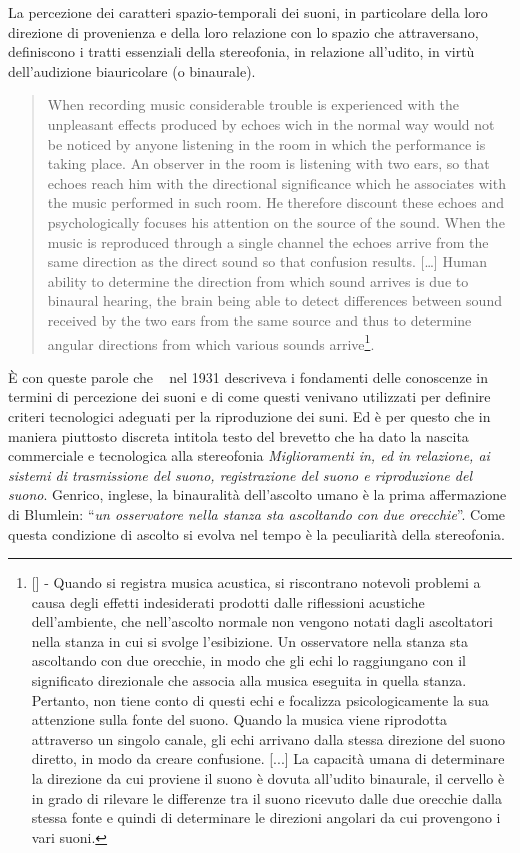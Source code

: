 La percezione dei caratteri spazio-temporali dei suoni, in particolare della
loro direzione di provenienza e della loro relazione con lo spazio che
attraversano, definiscono i tratti essenziali della stereofonia, in relazione
all'udito, in virtù dell’audizione biauricolare (o binaurale).

\begin{quote}
When recording music considerable trouble is experienced with the unpleasant
effects produced by echoes wich in the normal way would not be noticed by anyone
listening in the room in which the performance is taking place.
An observer in the room is listening with two ears, so that echoes reach him
with the directional significance which he associates with the music performed
in such room. He therefore discount these echoes and psychologically focuses
his attention on the source of the sound. When the music is reproduced through
a single channel the echoes arrive from the same direction as the direct sound
so that confusion results. [\ldots] Human ability to determine the direction
from which sound arrives is due to binaural hearing, the brain being able to
detect differences between sound received by the two ears from the same source
and thus to determine angular directions from which various sounds
arrive\footnote{[\cite{ab58}] - Quando si registra musica acustica, si riscontrano
notevoli problemi a causa degli effetti indesiderati prodotti dalle riflessioni
acustiche dell'ambiente, che nell'ascolto normale non vengono notati dagli
ascoltatori nella stanza in cui si svolge l'esibizione.
Un osservatore nella stanza sta ascoltando con due orecchie, in
modo che gli echi lo raggiungano con il significato direzionale che associa alla
musica eseguita in quella stanza. Pertanto, non tiene conto di questi echi e
focalizza psicologicamente la sua attenzione sulla fonte del suono. Quando la
musica viene riprodotta attraverso un singolo canale, gli echi arrivano dalla
stessa direzione del suono diretto, in modo da creare confusione. [...] La
capacità umana di determinare la direzione da cui proviene il suono è dovuta
all'udito binaurale, il cervello è in grado di rilevare le differenze tra il
suono ricevuto dalle due orecchie dalla stessa fonte e quindi di determinare le
direzioni angolari da cui provengono i vari suoni.}.
\end{quote}

È con queste parole che \adb~ nel 1931 descriveva i fondamenti delle conoscenze
in termini di percezione dei suoni e di come questi venivano utilizzati per definire
criteri tecnologici adeguati per la riproduzione dei suni. Ed è per questo che
in maniera piuttosto discreta intitola testo del brevetto che ha dato la nascita
commerciale e tecnologica alla stereofonia \emph{Miglioramenti in, ed in relazione,
ai sistemi di trasmissione del suono, registrazione del suono e riproduzione del suono}.
Genrico, inglese, la binauralità dell'ascolto umano è la prima affermazione di
Blumlein: “\emph{un osservatore nella stanza sta ascoltando con due orecchie}”.
Come questa condizione di ascolto si evolva nel tempo è la peculiarità della
stereofonia.

